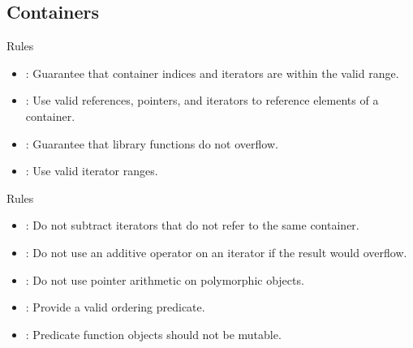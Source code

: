 \subsection{Containers}

\begin{frame}[t]{Rules}
\begin{itemize}
  \item {}: 
        Guarantee that container indices and iterators are within the valid range.
  \vfill
  \item {}: 
        Use valid references, pointers, and iterators to reference elements of a container.
  \vfill
  \item {}:
        Guarantee that library functions do not overflow. 
  \vfill
  \item {}: 
        Use valid iterator ranges.
\end{itemize}
\end{frame}

\begin{frame}[t]{Rules}
\begin{itemize}
  \item {}: 
        Do not subtract iterators that do not refer to the same container.
  \vfill
  \item {}:
        Do not use an additive operator on an iterator if the result would overflow. 
  \vfill
  \item {}: 
        Do not use pointer arithmetic on polymorphic objects.
  \vfill
  \item {}: 
        Provide a valid ordering predicate.
  \vfill
  \item {}: 
        Predicate function objects should not be mutable.
\end{itemize}
\end{frame}


